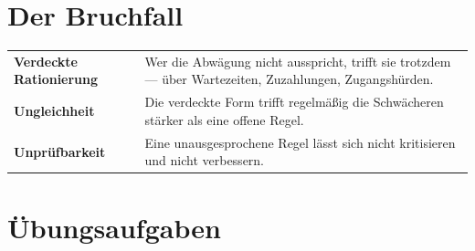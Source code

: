 \section{Der Bruchfall}

\begin{warnung}
\begin{center}
{\small
\renewcommand{\arraystretch}{1.52}
\begin{tabular}{@{}P{2.6cm}P{6.0cm}@{}}
\toprule
\textbf{Verdeckte Rationierung} & Wer die Abwägung nicht ausspricht, trifft sie trotzdem --- über Wartezeiten, Zuzahlungen, Zugangshürden.\\
\textbf{Ungleichheit} & Die verdeckte Form trifft regelmäßig die Schwächeren stärker als eine offene Regel.\\
\textbf{Unprüfbarkeit} & Eine unausgesprochene Regel lässt sich nicht kritisieren und nicht verbessern.\\
\bottomrule
\end{tabular}}
\end{center}

\begin{center}
\begin{minipage}{0.88\textwidth}
\end{minipage}
\end{center}
\end{warnung}

\section{Übungsaufgaben}

